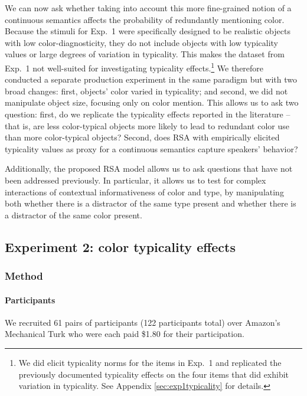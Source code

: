 \documentclass[11pt]{article}
\newcommand{\appref}[1]{Appendix \ref{#1}}
\begin{document}
We can now ask whether taking into account this more fine-grained notion of a continuous semantics affects the probability of redundantly mentioning color. Because the stimuli for Exp.~1 were specifically designed to be realistic objects with low color-diagnosticity, they do not include objects with low typicality values or large degrees of variation in typicality. This makes the dataset from Exp.~1 not well-suited for investigating typicality effects.\footnote{We did elicit typicality norms for the items in Exp.~1 and replicated the previously documented typicality effects on the four items that did exhibit variation in typicality. See \appref{sec:exp1typicality} for details.} We therefore conducted a separate production experiment in the same paradigm but with two broad changes: first, objects' color varied in typicality; and second, we did not manipulate object size, focusing only on color mention. This allows us to ask two question: first, do we replicate the typicality effects reported in the literature -- that is, are less color-typical objects more likely to lead to redundant color use than more color-typical objects? Second, does RSA with empirically elicited typicality values as proxy for a continuous semantics capture speakers' behavior?

Additionally, the proposed RSA model allows us to ask questions that have not been addressed previously. In particular, it allows us to test for complex interactions of contextual informativeness of color and type, by manipulating both whether there is a distractor of the same type present and whether there is a distractor of the same color present. 


\subsection{Experiment 2: color typicality effects}
\label{sec:modifiertypicalityeffects}



\subsubsection{Method}

\paragraph{Participants}
We recruited 61 pairs of participants (122 participants total) over Amazon's Mechanical Turk who were each paid \$1.80 for their participation. 
\end{document}
